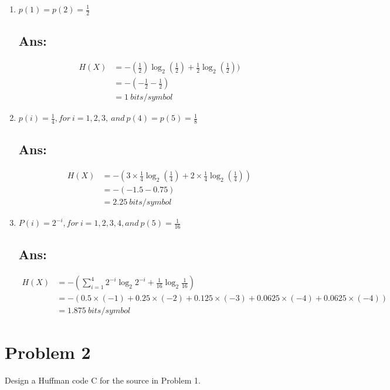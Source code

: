 \documentclass[a4paper, 11pt, oneside]{article} %
\begin{document}
\begin{enumerate}[label=(\alph*)]
	\item $p(1)=p(2)=\frac{1}{2}$
	\subsection*{Ans:}
	\begin{align*}
		H(X)&=-(\frac{1}{2})\log_{2}(\frac{1}{2})+\frac{1}{2}\log_{2}(\frac{1}{2})) \\
			&=-(-\frac{1}{2}-\frac{1}{2})  \\
			&= 1 ~bits/symbol
	\end{align*}
	\label{p:1-a}
	\item $p(i)=\frac{1}{4}, for~i = 1, 2, 3, ~and~p(4) = p(5) = \frac{1}{8}$
	\subsection*{Ans:}
	\begin{align*}
		H(X)&=-(3\times \frac{1}{4}\log_{2}(\frac{1}{4})+2\times 
				\frac{1}{4}\log_{2}(\frac{1}{4})) \\
			&=-(-1.5-0.75)  \\
			&= 2.25 ~bits/symbol
	\end{align*}
	\label{p:1-b}
	\item $P(i)=2^{-i}, for~i = 1, 2, 3, 4,and~p(5) =  \frac{1}{16}$
	\subsection*{Ans:}
	\begin{align*}
		H(X)&=-(\sum_{i=1}^{4} 2^{-i}\log_{2}2^{-i}+\frac{1}{16}\log_{2}\frac{1}{16}) \\
			&=-(0.5\times(-1)+0.25\times(-2)+0.125\times(-3)+0.0625\times(-4)
			  +0.0625\times(-4)) \\
			&= 1.875 ~bits/symbol
	\end{align*}
	\label{p:1-c}
	
\end{enumerate}

\clearpage

\section*{Problem 2}
Design a Huffman code C for the source in Problem 1.
\end{document}
